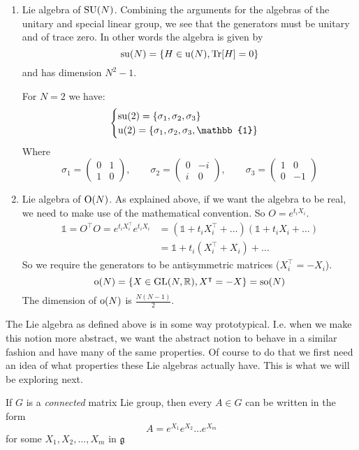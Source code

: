 \begin{example}
\begin{enumerate}
\item Lie algebra of $\operatorname{SU}(N)$. Combining the arguments for the algebras of the unitary and special linear group, we see that the generators must be unitary and of trace zero. In other words the algebra is given by
\[ \operatorname{su}(N) = \{ H\in\operatorname{u}(N), \operatorname{Tr}[H] = 0 \} \]
and has dimension $N^2-1$.

For $N=2$ we have:
\[ \begin{cases}
\suAlg(2) = \{\sigma_1, \sigma_2, \sigma_3\} \\
\uAlg(2) = \{\sigma_1, \sigma_2, \sigma_3, \mathbb{1}\}
\end{cases} \]
Where
\[ \sigma_1 = \begin{pmatrix}
0 & 1 \\ 1 & 0
\end{pmatrix}, \qquad \sigma_2 = \begin{pmatrix}
0 & -i \\ i & 0
\end{pmatrix}, \qquad \sigma_3 = \begin{pmatrix}
1 & 0 \\ 0 & -1
\end{pmatrix}\]

\item Lie algebra of $\operatorname{O}(N)$. As explained above, if we want the algebra to be real, we need to make use of the mathematical convention. So $O=e^{t_iX_i}$.
\begin{align}
\mathbb{1} = O^\intercal O = e^{t_iX_i^\intercal}e^{t_iX_i} &= (\mathbb{1}+t_i X_i^\intercal + \ldots )(\mathbb{1}+t_i X_i + \ldots) \\
&= \mathbb{1} + t_i(X^\intercal_i + X_i) + \ldots
\end{align}
So we require the generators to be antisymmetric matrices ($X_i^\intercal = -X_i$).
\[ \operatorname{o}(N) = \{ X \in \operatorname{GL}(N,\mathbb{R}), X^\intercal = -X \} = \operatorname{so}(N) \]
The dimension of $\operatorname{o}(N)$ is $\frac{N(N-1)}{2}$.
\end{enumerate}
\end{example}

The Lie algebra as defined above is in some way prototypical. I.e. when we make this notion more abstract, we want the abstract notion to behave in a similar fashion and have many of the same properties. Of course to do that we first need an idea of what properties these Lie algebras actually have. This is what we will be exploring next.

\begin{eigenschap}
If $G$ is a \textit{connected} matrix Lie group, then every $A \in G$ can be written in the form
\[ A = e^{X_1}e^{X_2}\ldots e^{X_m} \]
for some $X_1, X_2, \ldots, X_m$ in $\mathfrak{g}$
\end{eigenschap}

